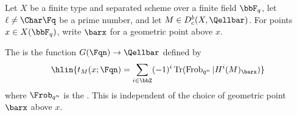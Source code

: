 
\begin{definition} \label{definition:frobenius_trace_of_a_cohomologically_bounded_complex_of_constructible_ell_adic_sheaves_on_a_finite_type_separated_scheme_over_a_finite_field}
    Let $X$ be a finite type and separated scheme over a finite field $\bbF_q$, let $\ell \neq \Char \Fq$ be a prime number, and let $M \in D_c^b(X,\Qellbar)$. For points $x \in X(\bbF_q)$, write $\barx$ for a geometric point above $x$. 
    
    The  is the function $G(\Fqn) \to \Qellbar$ defined by
    $$\hlin{t_M(x;\Fqn) = \sum_{i \in \bbZ} (-1)^i \operatorname{Tr}(\operatorname{Frob}_{q^n}|H^i(M)_{\barx} )}$$
    where $\Frob_{q^n}$ is the .
    This is independent of the choice of geometric point $\barx$ above $x$. 
\end{definition}